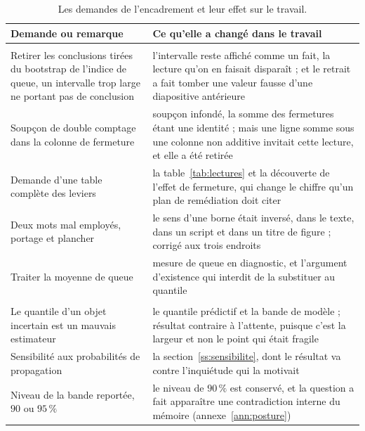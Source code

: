 \documentclass[12pt,a4paper]{article}
\theoremstyle{definition}
\begin{document}
\begin{table}[htbp]
\centering\small
\renewcommand{\arraystretch}{1.2}
\begin{tabular}{@{}>{\raggedright\arraybackslash}p{5.4cm}>{\raggedright\arraybackslash}p{8.4cm}@{}}
\toprule
\textbf{Demande ou remarque} & \textbf{Ce qu'elle a changé dans le travail} \\
\midrule
\multicolumn{2}{@{}l}{\emph{Du maître de stage, au point hebdomadaire}} \\
Retirer les conclusions tirées du bootstrap de l'indice de queue, un intervalle
trop large ne portant pas de conclusion &
l'intervalle reste affiché comme un fait, la lecture qu'on en faisait disparaît ;
et le retrait a fait tomber une valeur fausse d'une diapositive antérieure \\
Soupçon de double comptage dans la colonne de fermeture &
soupçon infondé, la somme des fermetures étant une identité ; mais une ligne
\og{}somme\fg{} sous une colonne non additive invitait cette lecture, et elle a
été retirée \\
Demande d'une table complète des leviers &
la table~\ref{tab:lectures} et la découverte de l'effet de fermeture, qui change
le chiffre qu'un plan de remédiation doit citer \\
Deux mots mal employés, \og{}portage\fg{} et \og{}plancher\fg{} &
le sens d'une borne était inversé, dans le texte, dans un script et dans un titre
de figure ; corrigé aux trois endroits \\
Traiter la moyenne de queue &
mesure de queue en diagnostic, et l'argument d'existence qui interdit de la
substituer au quantile \\
\midrule
\multicolumn{2}{@{}l}{\emph{De l'encadrement académique}} \\
\og{}Le quantile d'un objet incertain est un mauvais estimateur\fg{} &
le quantile prédictif et la bande de modèle ; résultat contraire à l'attente,
puisque c'est la largeur et non le point qui était fragile \\
Sensibilité aux probabilités de propagation &
la section~\ref{ss:sensibilite}, dont le résultat va contre l'inquiétude qui la
motivait \\
Niveau de la bande reportée, $90$ ou $95\,\%$ &
le niveau de $90\,\%$ est conservé, et la question a fait apparaître une
contradiction interne du mémoire (annexe~\ref{ann:posture}) \\
\bottomrule
\end{tabular}
\caption{Les demandes de l'encadrement et leur effet sur le travail.}
\label{tab:encadrement}
\end{table}
\end{document}

